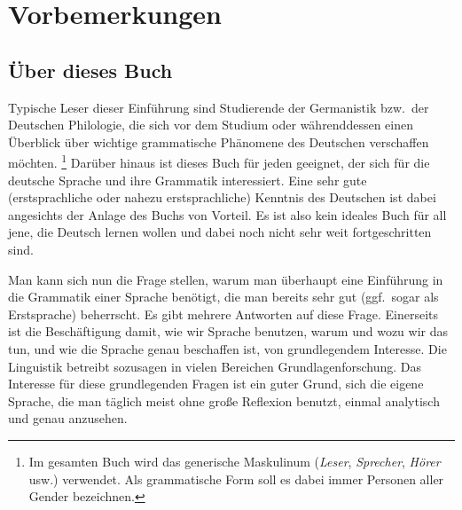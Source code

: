 \Phantom
{}

\chapter*{Vorbemerkungen}

\section*{Über dieses Buch}

Typische Leser dieser Einführung sind Studierende der Germanistik bzw.\ der Deutschen Philologie, die sich vor dem Studium oder währenddessen einen Überblick über wichtige grammatische Phänomene des Deutschen verschaffen möchten.%
\footnote{Im gesamten Buch wird das generische Maskulinum (\textit{Leser}, \textit{Sprecher}, \textit{Hörer} usw.) verwendet.
Als grammatische Form soll es dabei immer Personen aller Gender bezeichnen.}
Darüber hinaus ist dieses Buch für jeden geeignet, der sich für die deutsche Sprache und ihre Grammatik interessiert.
Eine sehr gute (erstsprachliche oder nahezu erstsprachliche) Kenntnis des Deutschen ist dabei angesichts der Anlage des Buchs von Vorteil.
Es ist also kein ideales Buch für all jene, die Deutsch lernen wollen und dabei noch nicht sehr weit fortgeschritten sind.

Man kann sich nun die Frage stellen, warum man überhaupt eine Einführung in die Grammatik einer Sprache benötigt, die man bereits sehr gut (ggf.\ sogar als Erstsprache) beherrscht.
Es gibt mehrere Antworten auf diese Frage.
Einerseits ist die Beschäftigung damit, wie wir Sprache benutzen, warum und wozu wir das tun, und wie die Sprache genau beschaffen ist, von grundlegendem Interesse.
Die Linguistik betreibt sozusagen in vielen Bereichen Grundlagenforschung.
Das Interesse für diese grundlegenden Fragen ist ein guter Grund, sich die eigene Sprache, die man täglich meist ohne große Reflexion benutzt, einmal analytisch und genau anzusehen.

